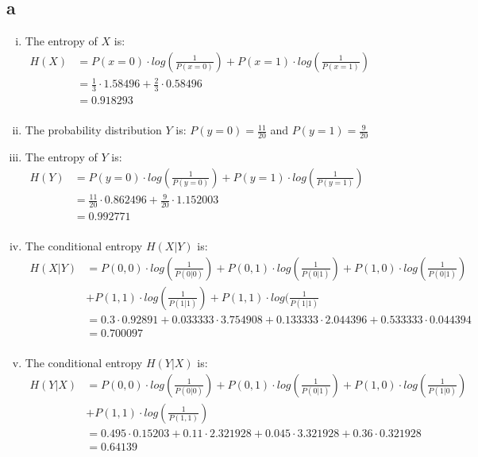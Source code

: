 \documentclass[letterpaper,notitlepage,twoside]{article}
\begin{document}
\subsection*{a}
\begin{enumerate}[(i)]
\item The entropy of  $X$ is:\\
$\begin{aligned}
H(X) &= P(x = 0) \cdot log(\frac{1}{P(x = 0)}) + P(x = 1) \cdot log(\frac{1}{P(x = 1)}) \\
&= \frac{1}{3} \cdot 1.58496 + \frac{2}{3} \cdot 0.58496 \\
&= 0.918293 \\ 
\end{aligned}$

\item The probability distribution $Y$ is: $P(y = 0) = \frac{11}{20}$ and $P(y = 1) = \frac{9}{20}$ \\

\item The entropy of $Y$ is: \\
$\begin{aligned}
H(Y) &= P(y = 0) \cdot log(\frac{1}{P(y = 0)}) + P(y = 1) \cdot log(\frac{1}{P(y = 1)}) \\
&= \frac{11}{20} \cdot 0.862496 + \frac{9}{20} \cdot 1.152003 \\
&= 0.992771 \\
\end{aligned}$

\item The conditional entropy $H(X | Y)$ is: \\
$\begin{aligned}
H(X|Y) &= P(0,0) \cdot log(\frac{1}{P(0|0)}) + P(0,1) \cdot log(\frac{1}{P(0|1)}) + P(1,0) \cdot log(\frac{1}{P(0|1)}) \\ 
&+ P(1,1) \cdot log(\frac{1}{P(1|1)}) + P(1,1) \cdot log(\frac{1}{P(1|1)} \\
&= 0.3 \cdot 0.92891 + 0.033333 \cdot 3.754908 + 0.133333 \cdot 2.044396 + 0.533333 \cdot 0.044394 \\
&= 0.700097 \\
\end{aligned}$

\item The conditional entropy $H(Y | X)$ is: \\
$\begin{aligned}
H(Y|X) &= P(0,0) \cdot log(\frac{1}{P(0|0)}) + P(0,1) \cdot log(\frac{1}{P(0|1)}) + P(1,0) \cdot log(\frac{1}{P(1|0)}) \\ &+ P(1,1) \cdot log(\frac{1}{P(1,1)}) \\
&= 0.495 \cdot 0.15203 + 0.11 \cdot 2.321928 + 0.045 \cdot 3.321928 + 0.36 \cdot 0.321928 \\
&= 0.64139 \\
\end{aligned}$


\end{enumerate}
\end{document}
